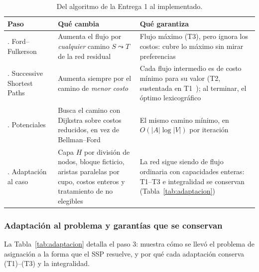 \documentclass{article}
\begin{document}
\begin{table}[H]
\centering
\small
\begin{tabularx}{\textwidth}{>{\raggedright\arraybackslash}p{3.2cm} >{\raggedright\arraybackslash}X >{\raggedright\arraybackslash}X}
\toprule
\textbf{Paso} & \textbf{Qué cambia} & \textbf{Qué garantiza} \\
\midrule
0. Ford--Fulkerson~\cite{fordfulkerson1956} & Aumenta el flujo por \emph{cualquier} camino $S \leadsto T$ de la red residual & Flujo máximo (T3), pero ignora los costos: cubre lo máximo sin mirar preferencias \\
1. Successive Shortest Paths~\cite{busacker1960} & Aumenta siempre por el camino de \emph{menor costo} & Cada flujo intermedio es de costo mínimo para su valor (T2, sustentada en T1~\cite{klein1967}); al terminar, el óptimo lexicográfico \\
2. Potenciales~\cite{tomizawa1971,edmonds1972} & Busca el camino con Dijkstra sobre costos reducidos, en vez de Bellman--Ford & El mismo camino mínimo, en $O(|A| \log |V|)$ por iteración \\
3. Adaptación al caso~\cite{ahuja1993} & Capa $H$ por división de nodos, bloque ficticio, aristas paralelas por cupo, costos enteros y tratamiento de no elegibles & La red sigue siendo de flujo ordinaria con capacidades enteras: T1--T3 e integralidad se conservan (Tabla~\ref{tab:adaptacion}) \\
\bottomrule
\end{tabularx}
\caption{Del algoritmo de la Entrega 1 al implementado.}
\label{tab:cadena}
\end{table}

\subsubsection{Adaptación al problema y garantías que se conservan}

La Tabla~\ref{tab:adaptacion} detalla el paso 3: muestra cómo se llevó el problema de asignación a la forma que el SSP resuelve, y por qué cada adaptación conserva (T1)--(T3) y la integralidad.
\end{document}
